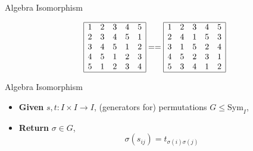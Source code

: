 \documentclass{beamer}
\begin{document}
\begin{frame}[fragile]{Algebra Isomorphism}

\[\begin{array}{|ccccc|}
    \hline 
1 & 2 & 3 & 4 & 5\\
2 & 3 & 4 & 5 & 1\\
3 & 4 & 5 & 1 & 2\\
4 & 5 & 1 & 2 & 3\\
5 & 1 & 2 & 3 & 4\\
\hline
\end{array}
== 
\begin{array}{|ccccc|}
    \hline 
1 & 2 & 3 & 4 & 5\\
2 & 4 & 1 & 5 & 3\\
3 & 1 & 5 & 2 & 4\\
4 & 5 & 2 & 3 & 1\\
5 & 3 & 4 & 1 & 2\\
\hline
\end{array}\]
\begin{block}{Algebra Isomorphism}
\begin{minipage}{0.6\textwidth}
\begin{itemize}
    \item {\color{csugreen}\textbf{Given}} $s,t:I\times I\to I$, 
    (generators for) permutations 
    $G\leq \mathrm{Sym}_I$, 
    \item {\color{csugreen}\textbf{Return}}  $\sigma\in G$,
    \[\sigma(s_{ij}) = t_{\sigma(i)\sigma(j)}\] 
\end{itemize}
\end{minipage}
\hfill
\begin{minipage}{0.3\textwidth}
\end{minipage}

\end{block}

\end{frame}
\end{document}
